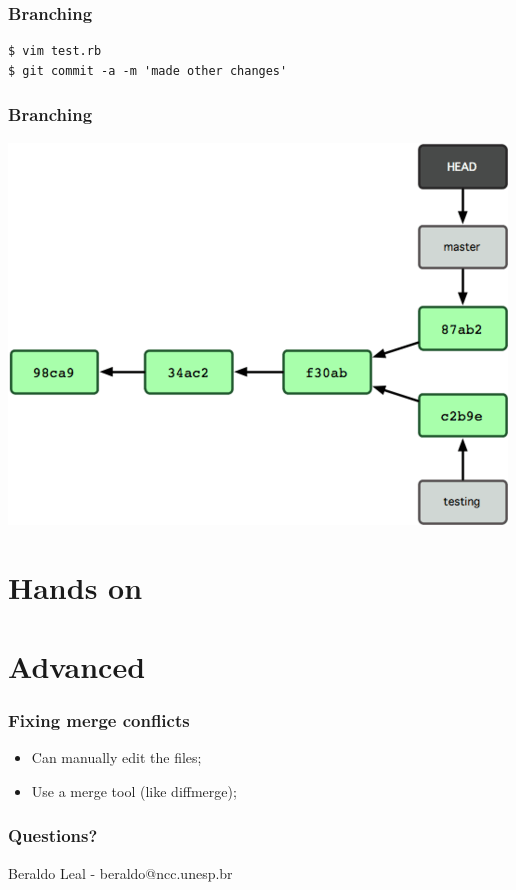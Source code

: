 \documentclass{beamer}
\begin{document}
\begin{frame}[fragile]
\frametitle{Branching}
\begin{lstlisting}
$ vim test.rb
$ git commit -a -m 'made other changes'
\end{lstlisting}
\end{frame}

\begin{frame}
\frametitle{Branching}
\begin{center}
  \includegraphics[width=\textwidth,height=0.6\textheight,keepaspectratio]{imgs/branch08.png}
\end{center}
\end{frame}

\section{Hands on}

\frame{\insertsection}

\section{Advanced}

\frame{\insertsection}
\begin{frame}
\frametitle{Fixing merge conflicts}
\begin{itemize}
\item Can manually edit the files;
\item Use a merge tool (like diffmerge);
\end{itemize}
\end{frame}


\begin{frame}
\frametitle{Questions?}

Beraldo Leal - beraldo@ncc.unesp.br
\end{frame}

\end{document}
